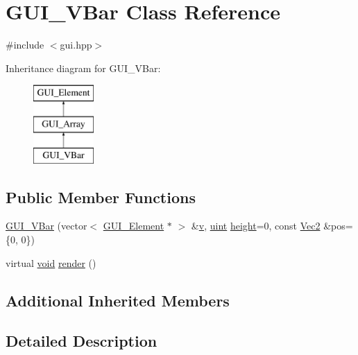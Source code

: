 \hypertarget{class_g_u_i___v_bar}{\section{G\-U\-I\-\_\-\-V\-Bar Class Reference}
\label{class_g_u_i___v_bar}
}


{\ttfamily \#include $<$gui.\-hpp$>$}

Inheritance diagram for G\-U\-I\-\_\-\-V\-Bar\-:\begin{figure}[H]
\begin{center}
\leavevmode
\includegraphics[height=3.000000cm]{class_g_u_i___v_bar}
\end{center}
\end{figure}
\subsection*{Public Member Functions}
\begin{DoxyCompactItemize}
\item 
\hyperlink{class_g_u_i___v_bar_a7c4384d997434d70d116e49ae2446b54}{G\-U\-I\-\_\-\-V\-Bar} (vector$<$ \hyperlink{class_g_u_i___element}{G\-U\-I\-\_\-\-Element} $\ast$ $>$ \&\hyperlink{_s_d_l__opengl_8h_a10a82eabcb59d2fcd74acee063775f90}{v}, \hyperlink{common_8hpp_a69aa29b598b851b0640aa225a9e5d61d}{uint} \hyperlink{_s_d_l__opengl_8h_aa352f2804b9902ac30769c00dde75d5f}{height}=0, const \hyperlink{class_vec2}{Vec2} \&pos=\{0, 0\})
\item 
virtual \hyperlink{_s_d_l__opengles2__gl2ext_8h_ae5d8fa23ad07c48bb609509eae494c95}{void} \hyperlink{class_g_u_i___v_bar_a89ef7a6c91df977a79d4ec9dbf37472e}{render} ()
\end{DoxyCompactItemize}
\subsection*{Additional Inherited Members}


\subsection{Detailed Description}


